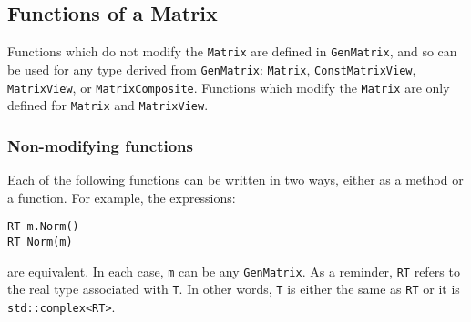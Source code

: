 \documentclass[twoside,letterpaper,11pt]{article}
\renewcommand{\tt}[1]{{\texttt {#1}}}
\begin{document}
\subsection{Functions of a Matrix}

Functions which do not modify the \tt{Matrix} are defined in 
\tt{GenMatrix}, and so can be used for any type derived from \tt{GenMatrix}:
\tt{Matrix}, \tt{ConstMatrixView}, \tt{MatrixView}, or \tt{MatrixComposite}.
Functions which modify the \tt{Matrix} are only defined for 
\tt{Matrix} and \tt{MatrixView}.

\subsubsection{Non-modifying functions}

Each of the following functions can be written in two ways,
either as a method or a function.
For example, the expressions:
\begin{verbatim}
RT m.Norm()
RT Norm(m)
\end{verbatim}
are equivalent.  
In each case, \tt{m} can be any \tt{GenMatrix}.
As a reminder, \tt{RT} refers to the real type associated with \tt{T}.
In other words, \tt{T} is either the same as \tt{RT} or it is
\tt{std::complex<RT>}.
\end{document}
